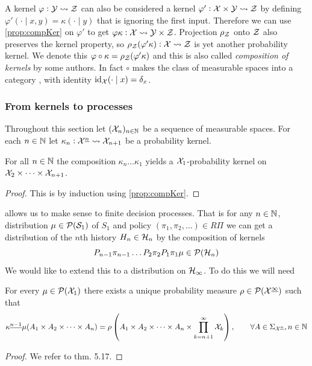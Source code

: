 \begin{rem}
  A kernel $\varphi:\mathcal{Y} \leadsto \mathcal{Z}$
  can also be considered a kernel
  $\varphi' : \mathcal{X} \times \mathcal{Y} \leadsto \mathcal{Z}$
  by defining
  $\varphi'(\cdot \mid x, y) = \kappa(\cdot \mid y)$
  that is ignoring the first input.
  Therefore we can use \cref{prop:compKer} on $\varphi'$ to get
  $\varphi \kappa : \mathcal{X} \leadsto \mathcal{Y} \times \mathcal{Z}$.
  Projection $\rho_\mathcal{Z}$ onto $\mathcal{Z}$ also preserves the kernel property,
  so $\rho_\mathcal{Z}(\varphi' \kappa) : \mathcal{X} \leadsto \mathcal{Z}$ is
  yet another probability kernel.
  We denote this $\varphi \circ \kappa = \rho_\mathcal{Z}(\varphi' \kappa)$
  and this is also called \emph{composition of kernels} by some authors.
  In fact $\circ$ makes the class of measurable spaces
  into a category ,
  with identity $\text{id}_{\mathcal{X}}(\cdot \mid x) = \delta_x$.
\end{rem}

\subsubsection{From kernels to processes}

Throughout this section let $(\mathcal{X}_n)_{n \in \mathbb{N}}$ be a sequence
of measurable spaces. For each $n \in \mathbb{N}$ let
$\kappa_n : \mathcal{X}^{\underline{n}} \leadsto \mathcal{X}_{n+1}$ be a probability kernel.

\begin{prop} For all $n \in \mathbb{N}$ the composition
  $\kappa_n \dots \kappa_1$ yields a $\mathcal{X}_1$-probability
  kernel on $\mathcal{X}_2 \times \dots \times \mathcal{X}_{n+1}$.
  \label{prop:kappaN}
\end{prop}
\begin{proof}
  This is by induction using \cref{prop:compKer}.
\end{proof}

 allows us to make sense to finite decision processes.
That is for any
$n \in \mathbb{N}$, distribution $\mu \in \mathcal{P}(\mathcal{S}_1)$ of $S_1$ 
and policy $(\pi_1, \pi_2, \dots) \in R\Pi$ we can get a distribution
of the $n$th history $H_n \in \mathcal{H}_n$ by the composition of kernels
\[ P_{n-1} \pi_{n-1} 
\dots P_2 \pi_2 P_1 \pi_1 \mu \in \mathcal{P}(\mathcal{H}_n) \]
We would like to extend this to a distribution on $\mathcal{H}_\infty$.
To do this we will need

\begin{thm}
  For every $\mu \in \mathcal{P}(\mathcal{X}_1)$ 
  there exists a unique probability measure
  $\rho \in \mathcal{P}(\mathcal{X}^{\underline{\infty}})$ such that
  \[ \kappa^{\underline{n-1}} \mu (A_1 \times A_2 \times \dots \times A_n) = \rho
    \left( A_1 \times A_2 \times \dots \times A_n \times
    \prod_{k=n+1}^\infty \mathcal{X}_k \right)
  , \qquad \forall A \in \Sigma_{\mathcal{X}^{\underline{n}}}, n \in \mathbb{N} \]
  \label{thm:ionescuTulcea}
\end{thm}
\begin{proof}
  We refer to  thm. 5.17. %
\end{proof}

